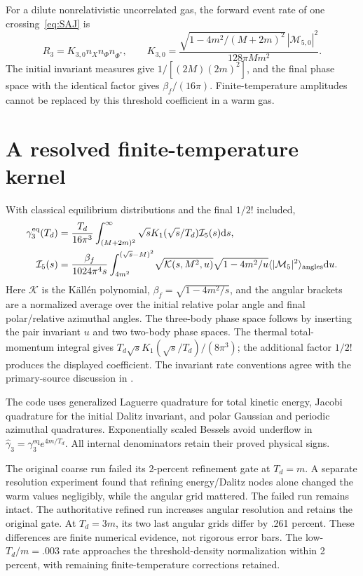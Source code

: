 \documentclass[11pt]{article}
\newcommand{\dd}{\mathrm d}
\newcommand{\eq}{\mathrm{eq}}
\begin{document}
For a dilute nonrelativistic uncorrelated gas, the forward event rate of
one crossing~\eqref{eq:SAJ} is
\begin{equation}
 R_3=K_{3,0}n_Xn_\Phi n_{\Phi^*},\qquad
 K_{3,0}=\frac{\sqrt{1-4m^2/(M+2m)^2}\,|\mathcal M_{5,0}|^2}
 {128\pi M m^2}.
\end{equation}
The initial invariant measures give $1/[(2M)(2m)^2]$, and the final phase
space with the identical factor gives $\beta_f/(16\pi)$. Finite-temperature
amplitudes cannot be replaced by this threshold coefficient in a warm gas.

\section{A resolved finite-temperature kernel}
With classical equilibrium distributions and the final $1/2!$ included,
\begin{align}
 \gamma_3^\eq(T_d)&=\frac{T_d}{16\pi^3}
 \int_{(M+2m)^2}^\infty\sqrt{s}K_1(\sqrt{s}/T_d)\mathcal I_5(s)\dd s,\\
 \mathcal I_5(s)&=\frac{\beta_f}{1024\pi^4s}
 \int_{4m^2}^{(\sqrt{s}-M)^2}\!
 \sqrt{\mathcal K(s,M^2,u)}\sqrt{1-4m^2/u}
 \langle|\mathcal M_5|^2\rangle_{\rm angles}\dd u.
\end{align}
Here $\mathcal K$ is the K\"all\'en polynomial, $\beta_f=\sqrt{1-4m^2/s}$,
and the angular brackets are a normalized average over the initial relative
polar angle and final polar/relative azimuthal angles. The three-body phase
space follows by inserting the pair invariant $u$ and two two-body phase
spaces. The thermal total-momentum integral gives
$T_d\sqrt{s}K_1(\sqrt{s}/T_d)/(8\pi^3)$; the additional factor $1/2!$
produces the displayed coefficient. The invariant rate conventions agree
with the primary-source discussion in \cite{SAthermal}.

The code uses generalized Laguerre quadrature for total kinetic energy,
Jacobi quadrature for the initial Dalitz invariant, and polar Gaussian and
periodic azimuthal quadratures. Exponentially scaled Bessels avoid
underflow in $\widehat\gamma_3=\gamma_3^\eq e^{4m/T_d}$.
All internal denominators retain their proved physical signs.

The original coarse run failed its 2-percent refinement gate at $T_d=m$.
A separate resolution experiment found that refining energy/Dalitz nodes
alone changed the warm values negligibly, while the angular grid mattered.
The failed run remains intact. The authoritative refined run increases
angular resolution and retains the original gate. At $T_d=3m$, its two
last angular grids differ by .261 percent. These differences are finite
numerical evidence, not rigorous error bars. The low-$T_d/m=.003$ rate
approaches the threshold-density normalization within 2 percent, with
remaining finite-temperature corrections retained.
\end{document}
